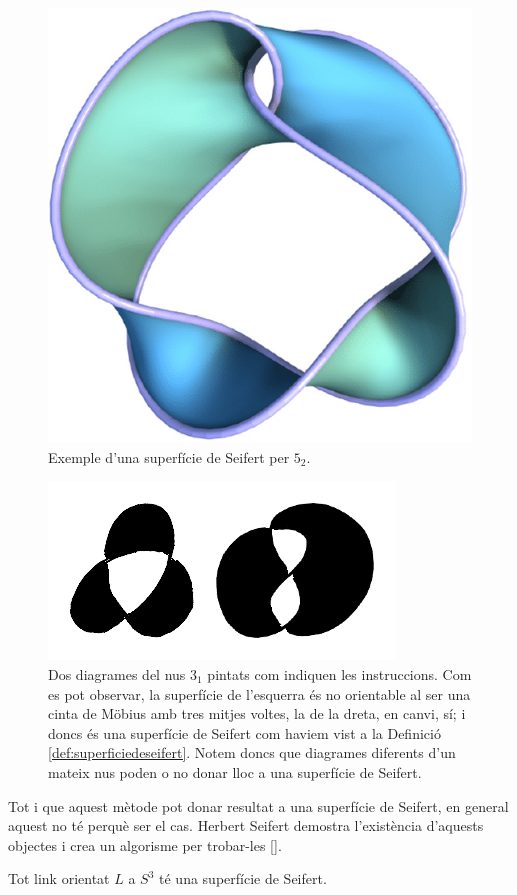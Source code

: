 \begin{figure}
	\centering
	\includegraphics[width=0.6\linewidth]{img/seifertsurface.png}
	\caption{Exemple d'una superfície de Seifert per $5_2$.}\label{fig:superficiedeseifert}
\end{figure}

\begin{figure}
	\centering
	\includegraphics[width=0.6\linewidth]{img/trefoilseifert.png}
	\caption{Dos diagrames del nus $3_1$ pintats com indiquen les instruccions. Com es pot observar, la superfície de l'esquerra és no orientable al ser una cinta de Möbius amb tres mitjes voltes, la de la dreta, en canvi, sí; i doncs és una superfície de Seifert com haviem vist a la Definició \ref{def:superficiedeseifert}. Notem doncs que diagrames diferents d'un mateix nus poden o no donar lloc a una superfície de Seifert.}\label{fig:trefoilseifert}
\end{figure}

Tot i que aquest mètode pot donar resultat a una superfície de Seifert, en general aquest no té perquè ser el cas. Herbert Seifert demostra l'existència d'aquests objectes i crea un algorisme per trobar-les [\cite{seifert}].

\begin{theorem}\label{theo:existenciadesuperficiesdeseifert}
	Tot link orientat $L$ a $S^3$ té una superfície de Seifert.
\end{theorem}

